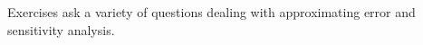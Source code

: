 {\noindent Exercises}
{ ask a variety of questions dealing with approximating error and sensitivity analysis.}
